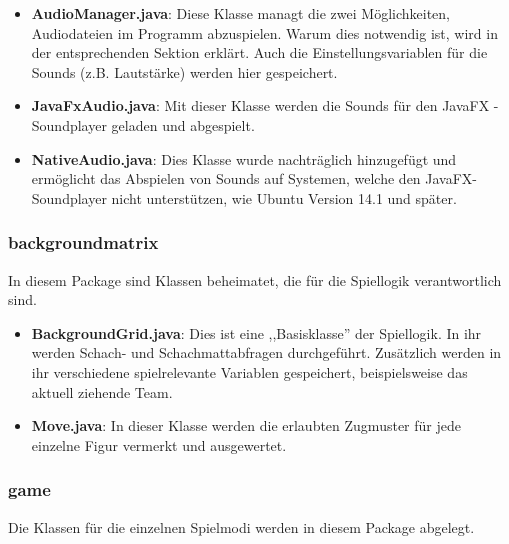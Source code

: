 \documentclass[12pt,a4paper]{article}
\begin{document}
\begin{itemize}
	\item{\textbf{AudioManager.java}: Diese Klasse managt die zwei Möglichkeiten, Audiodateien im Programm abzuspielen. Warum dies notwendig ist, wird in der entsprechenden Sektion erklärt. %
Auch die Einstellungsvariablen für die Sounds (z.B. Lautstärke) werden hier gespeichert. }
	
	\item{\textbf{JavaFxAudio.java}: Mit dieser Klasse werden die Sounds für den JavaFX - Soundplayer geladen und abgespielt. }	
	
	\item{\textbf{NativeAudio.java}: Dies Klasse wurde nachträglich hinzugefügt und ermöglicht das Abspielen von Sounds auf Systemen, welche den JavaFX-Soundplayer nicht unterstützen, wie Ubuntu Version 14.1 und später.}
	
\end{itemize}

\subsubsection{backgroundmatrix}

In diesem Package sind Klassen beheimatet, die für die Spiellogik verantwortlich sind.

\begin{itemize}
	\item{\textbf{BackgroundGrid.java}: Dies ist eine ,,Basisklasse'' der Spiellogik. In ihr werden Schach- und Schachmattabfragen durchgeführt. Zusätzlich werden in ihr verschiedene spielrelevante Variablen gespeichert, beispielsweise das aktuell ziehende Team.}
	
	\item{\textbf{Move.java}: In dieser Klasse werden die erlaubten Zugmuster für jede einzelne Figur vermerkt und ausgewertet.  }

\end{itemize}
 
\subsubsection{game}

Die Klassen für die einzelnen Spielmodi werden in diesem Package abgelegt. 
\end{document}
